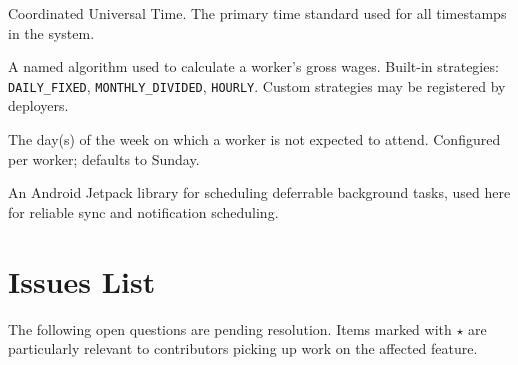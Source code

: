 \documentclass[12pt, a4paper]{article}
\begin{document}
\begin{description}[leftmargin=4cm, style=nextline]
    \item[UTC]
        Coordinated Universal Time. The primary time standard used for
        all timestamps in the system.
    \item[Wage Strategy]
        A named algorithm used to calculate a worker's gross wages.
        Built-in strategies: \texttt{DAILY\_FIXED},
        \texttt{MONTHLY\_DIVIDED}, \texttt{HOURLY}. Custom strategies
        may be registered by deployers.
    \item[Weekly Off]
        The day(s) of the week on which a worker is not expected to
        attend. Configured per worker; defaults to Sunday.
    \item[WorkManager]
        An Android Jetpack library for scheduling deferrable background
        tasks, used here for reliable sync and notification scheduling.
\end{description}
\newpage


\section{Issues List}
\label{app:issues}

The following open questions are pending resolution. Items marked with
$\star$ are particularly relevant to contributors picking up work on the
affected feature.
\end{document}
